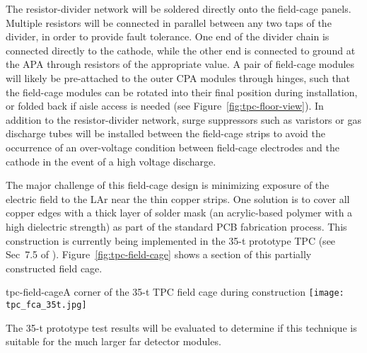 The resistor-divider network will be soldered directly onto the
field-cage panels. Multiple resistors will be connected in parallel
between any two taps of the divider, in order to provide fault
tolerance. 
One end of the divider chain is connected directly to the
cathode, while the other end is connected to ground at the APA through
resistors of the appropriate value.  %
A pair of
field-cage modules will likely be %
pre-attached to the outer CPA modules through
hinges, %
such that the field-cage modules can be rotated into their final
position during installation, or folded back if aisle access is needed
(see Figure~\ref{fig:tpc-floor-view}).  In addition to the resistor-divider
network, surge suppressors such as varistors or gas discharge tubes
will be installed between the field-cage strips to avoid the occurrence of an
over-voltage condition between field-cage electrodes and the
cathode in the event of a high voltage discharge.

The major challenge of this field-cage design is 
minimizing exposure of the electric field to the LAr
near the thin copper
strips.  One solution is to cover all copper edges with a thick layer
of solder mask (an acrylic-based polymer with a high dielectric
strength) as part of the standard PCB fabrication process.  This
construction is currently being implemented in the 35-t prototype TPC (see
Sec~7.5 of \anxlbnefd).  Figure~\ref{fig:tpc-field-cage} shows a
section of this partially constructed field cage.  
\begin{cdrfigure}{tpc-field-cage}{A corner of the 35-t TPC 
field cage during construction}
\texttt{[image: tpc\_fca\_35t.jpg]}
\end{cdrfigure}
The 35-t prototype test results will be evaluated to determine if this
technique is suitable for the much larger far detector modules.
 
